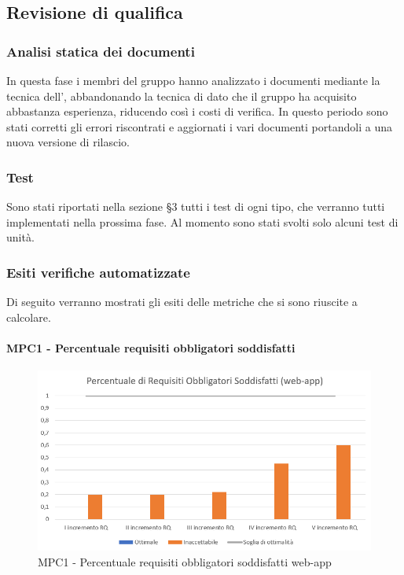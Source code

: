 \subsection{Revisione di qualifica}
\subsubsection{Analisi statica dei documenti}
In questa fase i membri del gruppo \Gruppo{} hanno analizzato i documenti mediante la tecnica dell', abbandonando la tecnica di  dato che il gruppo ha acquisito abbastanza esperienza, riducendo così i costi di verifica. In questo periodo sono stati corretti gli errori riscontrati e aggiornati i vari documenti portandoli a una nuova versione di rilascio.
\subsubsection{Test}
Sono stati riportati nella sezione §3 tutti i test di ogni tipo, che verranno tutti implementati nella prossima fase. Al momento sono stati svolti solo alcuni test di unità.
\subsubsection{Esiti verifiche automatizzate}
Di seguito verranno mostrati gli esiti delle metriche che si sono riuscite a calcolare.

\newpage
\paragraph{MPC1 - Percentuale requisiti obbligatori soddisfatti}
\begin{figure}[h!]
    \centering
      \includegraphics[scale=1]{Immagini/PercReqObbWA.PNG}
    \caption{MPC1 - Percentuale requisiti obbligatori soddisfatti web-app}
  \end{figure}

